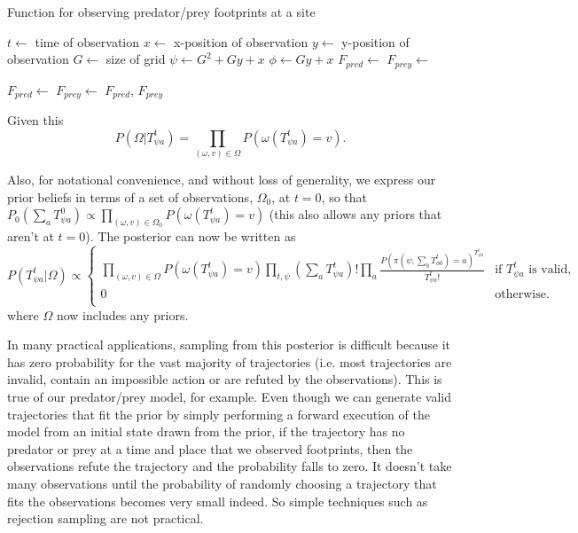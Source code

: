 \begin{algorithm}
\caption{Function for observing predator/prey footprints at a site}
\label{observationFunc}
\begin{algorithmic}
 
\State $t \leftarrow$ time of observation
\State $x \leftarrow$ x-position of observation
\State $y \leftarrow$ y-position of observation
\State $G \leftarrow$ size of grid
\State $\psi \leftarrow G^2 + Gy + x$     
\State $\phi \leftarrow Gy + x$     
\State $F_{pred} \leftarrow$   
\State $F_{prey} \leftarrow$   

\State $F_{pred} \leftarrow$ 
\EndIf
{}
\State $F_{prey} \leftarrow$ 
\EndIf
\State\Return $F_{pred}$, $F_{prey}$
\EndFunction
\end{algorithmic}
\end{algorithm}


Given this
\[
P(\Omega|T^t_{\psi a}) = \prod_{(\omega,v) \in \Omega} P(\omega(T^t_{\psi a})=v).
\]

Also, for notational convenience, and without loss of generality, we express our prior beliefs in terms of a set of observations, $\Omega_0$, at $t=0$, so that $P_0(\sum_a T^0_{\psi a}) \propto \prod_{(\omega,v) \in \Omega_0} P(\omega(T^t_{\psi a})=v)$ (this also allows any priors that aren't at $t=0$). The posterior can now be written as
\begin{equation}
P(T^t_{\psi a}|\Omega) \propto 
\begin{cases}
\prod_{(\omega,v) \in \Omega} P\left(\omega(T^{t}_{\psi a})=v\right) \prod_{t, \psi}\left(\sum_a T^t_{\psi a}\right)!\prod_{a}\frac{P(\pi(\psi,\sum_bT^{t}_{\phi b})=a)^{T^{t}_{\psi a}}}{T^t_{\psi a}!} & \text{if } T^t_{\psi a} \text{ is valid}, \\
0 & \text{otherwise}.\\
\end{cases}
\label{posterior}
\end{equation}
where $\Omega$ now includes any priors.

In many practical applications, sampling from this posterior is difficult because it has zero probability for the vast majority of trajectories (i.e. most trajectories are invalid, contain an impossible action or are refuted by the observations). This is true of our predator/prey model, for example. Even though we can generate valid trajectories that fit the prior by simply performing a forward execution of the model from an initial state drawn from the prior, if the trajectory has no predator or prey at a time and place that we observed footprints, then the observations refute the trajectory and the probability falls to zero. It doesn't take many observations until the probability of randomly choosing a trajectory that fits the observations becomes very small indeed. So simple techniques such as rejection sampling are not practical.

